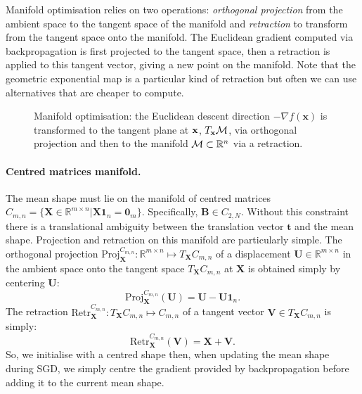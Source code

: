 \documentclass[runningheads]{llncs}
\newcommand{\R}{\mathbb{R}}
\newcommand{\Proj}{\textrm{Proj}}
\newcommand{\Retr}{\textrm{Retr}}
\begin{document}
Manifold optimisation relies on two operations: {\it orthogonal projection} from the ambient space to the tangent space of the manifold and {\it retraction} to transform from the tangent space onto the manifold. The Euclidean gradient computed via backpropagation is first projected to the tangent space, then a retraction is applied to this tangent vector, giving a new point on the manifold. Note that the geometric exponential map is a particular kind of retraction but often we can use alternatives that are cheaper to compute.

%

\begin{figure}[!t] \centering
\noindent{}
\caption{Manifold optimisation: the Euclidean descent direction $-\nabla f(\mathbf{x})$ is transformed to the tangent plane at ${\bf x}$, $T_{\mathbf{x}}{\cal M}$, via orthogonal projection and then to the manifold ${\cal M}\subset\R^n$ via a retraction.}
\label{fig:manifoldopt}
\end{figure}

\paragraph{Centred matrices manifold.} The mean shape must lie on the manifold of centred matrices $C_{m,n}=\{\mathbf{X}\in\R^{m\times n} | \mathbf{X1}_n=\mathbf{0}_m \}$. Specifically, $\mathbf{B}\in C_{2,N}$. Without this constraint there is a translational ambiguity between the translation vector $\mathbf{t}$ and the mean shape. Projection and retraction on this manifold are particularly simple. The orthogonal projection $\Proj_{\mathbf{X}}^{C_{m,n}}:\R^{m\times n}\mapsto T_{\mathbf{X}}C_{m,n}$ of a displacement $\mathbf{U}\in \R^{m\times n}$ in the ambient space onto the tangent space $T_{\mathbf{X}}C_{m,n}$ at $\mathbf{X}$ is obtained simply by centering $\mathbf{U}$:
\begin{equation}
\Proj_{\mathbf{X}}^{C_{m,n}}(\mathbf{U}) = \mathbf{U}-\mathbf{U1}_n.
\end{equation}
The retraction $\Retr_{\mathbf{X}}^{C_{m,n}}:T_{\mathbf{X}}C_{m,n}\mapsto C_{m,n}$ of a tangent vector $\mathbf{V}\in T_{\mathbf{X}}C_{m,n}$ is simply:
\begin{equation}
\Retr_{\mathbf{X}}^{C_{m,n}}(\mathbf{V}) = \mathbf{X}+\mathbf{V}.
\end{equation}
So, we initialise with a centred shape then, when updating the mean shape during SGD, we simply centre the gradient provided by backpropagation before adding it to the current mean shape.
\end{document}
